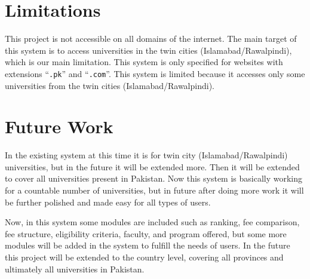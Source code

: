 \section{Limitations}

This project is not accessible on all domains of the internet. The main target of this system is to access universities in the twin cities (Islamabad/Rawalpindi), which is our main limitation. This system is only specified for websites with extensions ``\texttt{.pk}'' and ``\texttt{.com}''. This system is limited because it accesses only some universities from the twin cities (Islamabad/Rawalpindi).

\section{Future Work}

In the existing system at this time it is for twin city (Islamabad/Rawalpindi) universities, but in the future it will be extended more. Then it will be extended to cover all universities present in Pakistan. Now this system is basically working for a countable number of universities, but in future after doing more work it will be further polished and made easy for all types of users.

Now, in this system some modules are included such as ranking, fee comparison, fee structure, eligibility criteria, faculty, and program offered, but some more modules will be added in the system to fulfill the needs of users. In the future this project will be extended to the country level, covering all provinces and ultimately all universities in Pakistan.
